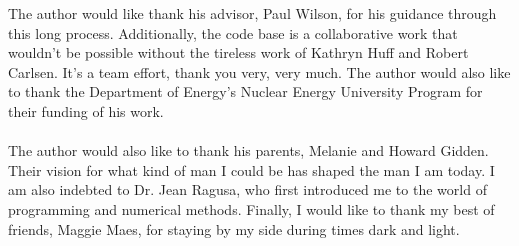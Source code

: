 

The author would like thank his advisor, Paul Wilson, for his guidance through
this long process. Additionally, the \Cyclus code base is a collaborative work
that wouldn't be possible without the tireless work of Kathryn Huff and Robert
Carlsen. It's a team effort, thank you very, very much. The author would also
like to thank the Department of Energy's Nuclear Energy University Program for
their funding of his work. 
\\ \\
The author would also like to thank his parents, Melanie and Howard
Gidden. Their vision for what kind of man I could be has shaped the man I am
today. I am also indebted to Dr. Jean Ragusa, who first introduced me to the
world of programming and numerical methods. Finally, I would like to thank my
best of friends, Maggie Maes, for staying by my side during times dark and
light.
